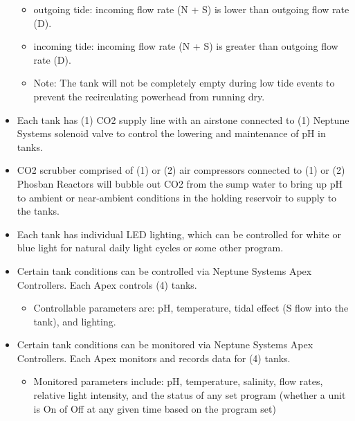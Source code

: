 \documentclass[
]{book}
\providecommand{\tightlist}{%
  \setlength{\itemsep}{0pt}\setlength{\parskip}{0pt}}
\begin{document}
\begin{itemize}
  \begin{itemize}
  \tightlist
  \item
    outgoing tide: incoming flow rate (N + S) is lower than outgoing flow rate (D).
  \item
    incoming tide: incoming flow rate (N + S) is greater than outgoing flow rate (D).
  \item
    Note: The tank will not be completely empty during low tide events to prevent the recirculating powerhead from running dry.\\
  \end{itemize}
\item
  Each tank has (1) CO2 supply line with an airstone connected to (1) Neptune Systems solenoid valve to control the lowering and maintenance of pH in tanks.\\
\item
  CO2 scrubber comprised of (1) or (2) air compressors connected to (1) or (2) Phosban Reactors will bubble out CO2 from the sump water to bring up pH to ambient or near-ambient conditions in the holding reservoir to supply to the tanks.\\
\item
  Each tank has individual LED lighting, which can be controlled for white or blue light for natural daily light cycles or some other program.\\
\item
  Certain tank conditions can be controlled via Neptune Systems Apex Controllers. Each Apex controls (4) tanks.

  \begin{itemize}
  \tightlist
  \item
    Controllable parameters are: pH, temperature, tidal effect (S flow into the tank), and lighting.\\
  \end{itemize}
\item
  Certain tank conditions can be monitored via Neptune Systems Apex Controllers. Each Apex monitors and records data for (4) tanks.

  \begin{itemize}
  \tightlist
  \item
    Monitored parameters include: pH, temperature, salinity, flow rates, relative light intensity, and the status of any set program (whether a unit is On of Off at any given time based on the program set)
  \end{itemize}
\end{itemize}
\end{document}
